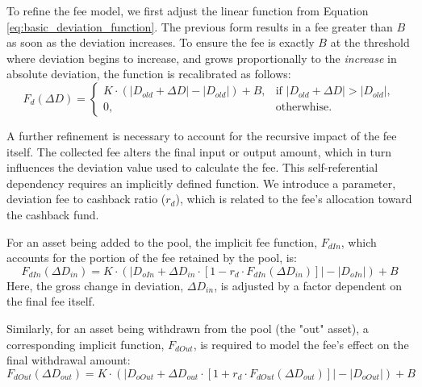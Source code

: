To refine the fee model, we first adjust the linear function from Equation \ref{eq:basic_deviation_function}. The previous form results in a fee greater than $B$ as soon as the deviation increases. To ensure the fee is exactly $B$ at the threshold where deviation begins to increase, and grows proportionally to the \textit{increase} in absolute deviation, the function is recalibrated as follows:
\begin{equation}
	\label{eq:general_deviation_function}
	F_{d}(\Delta D) = \begin{cases} 
		K \cdot (\lvert D_{old} + \Delta D \rvert - \lvert D_{old} \rvert) + B, & \text{if } \lvert D_{old} + \Delta D \rvert > \lvert D_{old} \rvert, \\
		0, & \text{otherwhise.} 
	\end{cases}	
\end{equation}

A further refinement is necessary to account for the recursive impact of the fee itself. The collected fee alters the final input or output amount, which in turn influences the deviation value used to calculate the fee. This self-referential dependency requires an implicitly defined function. We introduce a parameter, deviation fee to cashback ratio ($r_d$), which is related to the fee's allocation toward the cashback fund.

For an asset being added to the pool, the implicit fee function, $F_{dIn}$, which accounts for the portion of the fee retained by the pool, is:
\begin{equation}
	\label{eq:deviation_in_function}
	F_{dIn}(\Delta D_{in}) = K \cdot (\lvert D_{oIn} + \Delta D_{in} \cdot [1 - r_{d} \cdot F_{dIn}(\Delta D_{in}) ] \rvert - \lvert D_{oIn} \rvert) + B  
\end{equation}
Here, the gross change in deviation, $\Delta D_{in}$, is adjusted by a factor dependent on the final fee itself.

Similarly, for an asset being withdrawn from the pool (the "out" asset), a corresponding implicit function, $F_{dOut}$, is required to model the fee's effect on the final withdrawal amount:
\begin{equation}
	\label{eq:deviation_out_function}
	F_{dOut}(\Delta D_{out}) = K \cdot (\lvert D_{oOut} + \Delta D_{out} \cdot [1 + r_{d} \cdot F_{dOut}(\Delta D_{out})] \rvert - \lvert D_{oOut} \rvert) + B 
\end{equation}

